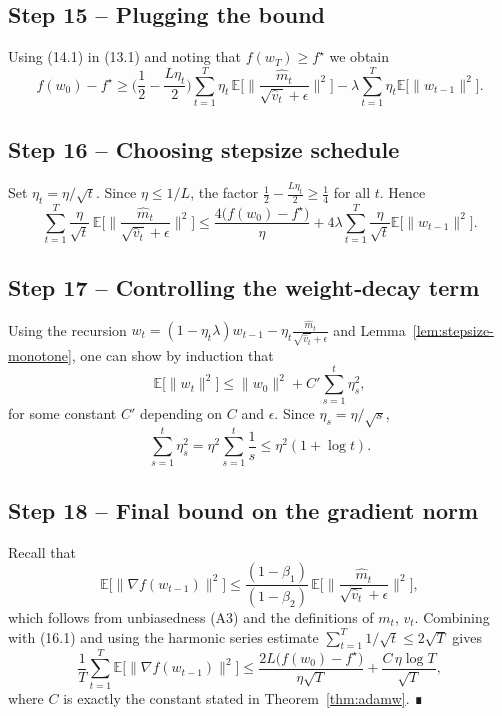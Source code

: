 \documentclass{article}
\newcommand{\EE}{\mathbb{E}}
\begin{document}
\subsection*{Step 15 – Plugging the bound}
Using (14.1) in (13.1) and noting that $f(w_T)\ge f^\star$ we obtain
\[
f(w_0)-f^\star
\ge
\Big(\frac{1}{2}-\frac{L\eta_t}{2}\Big)\sum_{t=1}^{T}\eta_t\,
\EE\!\Big[\Big\|\frac{\hat m_t}{\sqrt{\hat v_t}+\epsilon}\Big\|^2\Big]
- \lambda\sum_{t=1}^{T}\eta_t\EE\!\big[\|w_{t-1}\|^2\big].
\tag{15.1}
\]

\subsection*{Step 16 – Choosing stepsize schedule}
Set $\eta_t=\eta/\sqrt{t}$. Since $\eta\le 1/L$, the factor $\frac{1}{2}-\frac{L\eta_t}{2}\ge \frac{1}{4}$ for all $t$. Hence
\[
\sum_{t=1}^{T}\frac{\eta}{\sqrt{t}}\,
\EE\!\Big[\Big\|\frac{\hat m_t}{\sqrt{\hat v_t}+\epsilon}\Big\|^2\Big]
\le
\frac{4\big(f(w_0)-f^\star\big)}{\eta}
+4\lambda\sum_{t=1}^{T}\frac{\eta}{\sqrt{t}}\EE\!\big[\|w_{t-1}\|^2\big].
\tag{16.1}
\]

\subsection*{Step 17 – Controlling the weight‑decay term}
Using the recursion $w_t = (1-\eta_t\lambda)w_{t-1} -\eta_t \frac{\hat m_t}{\sqrt{\hat v_t}+\epsilon}$ and Lemma~\ref{lem:stepsize-monotone}, one can show by induction that
\[
\EE\!\big[\|w_{t}\|^2\big]\le \|w_0\|^2 + C'\sum_{s=1}^{t}\eta_s^2,
\]
for some constant $C'$ depending on $C$ and $\epsilon$. Since $\eta_s=\eta/\sqrt{s}$,
\[
\sum_{s=1}^{t}\eta_s^2 = \eta^2\sum_{s=1}^{t}\frac{1}{s}\le \eta^2(1+\log t).
\tag{17.1}
\]

\subsection*{Step 18 – Final bound on the gradient norm}
Recall that
\[
\EE\!\big[\|\nabla f(w_{t-1})\|^2\big]
\le
\frac{(1-\beta_1)}{(1-\beta_2)}\,
\EE\!\Big[\Big\|\frac{\hat m_t}{\sqrt{\hat v_t}+\epsilon}\Big\|^2\Big],
\]
which follows from unbiasedness (A3) and the definitions of $m_t$, $v_t$. Combining with (16.1) and using the harmonic series estimate $\sum_{t=1}^{T}1/\sqrt{t}\le 2\sqrt{T}$ gives
\[
\frac{1}{T}\sum_{t=1}^{T}\EE\!\big[\|\nabla f(w_{t-1})\|^2\big]
\le
\frac{2L\big(f(w_0)-f^\star\big)}{\eta\sqrt{T}}
+\frac{C\,\eta\log T}{\sqrt{T}},
\]
where $C$ is exactly the constant stated in Theorem~\ref{thm:adamw}. ∎
\end{document}
